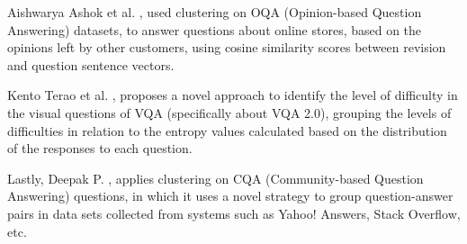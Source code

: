 Aishwarya Ashok et al. \cite{ashok-etal-2020-simsterq}, used clustering on OQA (Opinion-based Question Answering) datasets, to answer questions about online stores, based on the opinions left by other customers, using cosine similarity scores between revision and question sentence vectors.

Kento Terao et al. \cite{entropy-clustering}, proposes a novel approach to identify the level of difficulty in the visual questions of VQA (specifically about VQA 2.0), grouping the levels of difficulties in relation to the entropy values calculated based on the distribution of the responses to each question.

Lastly, Deepak P. \cite{p-2016-mixkmeans}, applies clustering on CQA (Community-based Question Answering) questions, in which it uses a novel strategy to group question-answer pairs in data sets collected from systems such as Yahoo! Answers, Stack Overflow, etc.
